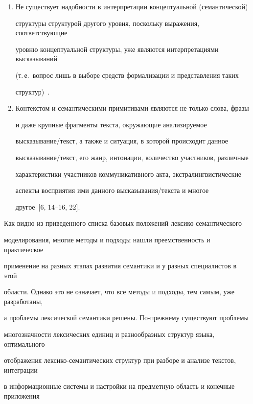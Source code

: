 \begin{enumerate}[1.]
которая закодирована людьми на ментальном уровне~\cite{21-2-11}.


\item Не существует надобности в интерпретации концептуальной (семантической) 


структуры структурой другого уровня, поскольку выражения, соответствующие 


уровню концептуальной структуры, уже являются интерпретациями высказываний 


(т.\,е.\ вопрос лишь в выборе средств формализации и пред\-став\-ле\-ния таких 


структур)~\cite{22-2-11}.


\item Контекстом и семантическими примитивами являются не только слова, фразы 


и даже крупные фрагменты текста, окружающие анализируемое 


высказывание/текст, а также и ситуация, в которой происходит данное 


высказывание/текст, его жанр, интонации, количество участников, различные 


характеристики участников коммуникативного акта, экстралингвистические 


аспекты восприятия ими данного высказывания/текста и многое 


другое~[6, 14--16, 22].


   \end{enumerate}


   


   Как видно из приведенного списка базовых положений лексико-се\-ман\-ти\-че\-ско\-го 


моделирования, многие методы и подходы нашли преемственность и практическое 


применение на разных этапах развития семантики и у разных специалистов в этой 


области. Однако это не означает, что все методы и подходы, тем самым, уже разработаны, 


а проблемы лексической семантики решены. По-преж\-не\-му существуют проблемы 


многозначности лексических единиц и разнообразных структур языка, оптимального 


отображения лек\-си\-ко-се\-ман\-ти\-че\-ских структур при разборе и анализе текстов, интеграции 


в информационные системы и настройки на предметную область и конечные приложения 


